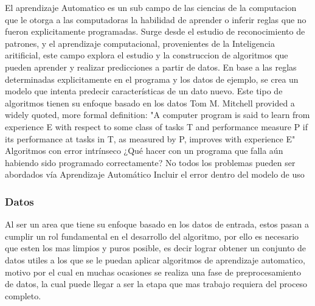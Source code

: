 \documentclass[a4paper,10pt]{article}
\begin{document}
    El aprendizaje Automatico es un sub campo de las ciencias de la computacion que le otorga a las computadoras la habilidad de aprender o inferir reglas que no fueron explicitamente programadas.
    Surge desde el estudio de reconocimiento de patrones, y el aprendizaje computacional, provenientes de la Inteligencia aritificial, este campo explora el estudio y la construccion de algoritmos
    que pueden aprender y realizar predicciones a partir de datos. En base a las reglas determinadas explicitamente en el programa y los datos de ejemplo, se crea un modelo que intenta predecir
    características de un dato nuevo. Este tipo de algoritmos tienen su enfoque basado en los datos
    Tom M. Mitchell provided a widely quoted, more formal definition: "A computer program is said to learn from experience E with respect to some class of tasks T and 
    performance measure P if its performance at tasks in T, as measured by P, improves with experience E"
    Algoritmos con error intrínseco
    ¿Qué hacer con un programa que falla aún habiendo sido programado correctamente?
    No todos los problemas pueden ser abordados vía Aprendizaje Automático
    Incluir el error dentro del modelo de uso

    \subsubsection{Datos}
      Al ser un area que tiene su enfoque basado en los datos de entrada, estos pasan a cumplir un rol fundamental en el desarrollo del algoritmo, por ello es necesario que 
      esten los mas limpios y puros posible, es decir lograr obtener un conjunto de datos utiles a los que se le puedan aplicar algoritmos de aprendizaje automatico, 
      motivo por el cual en muchas ocasiones se realiza una fase de preprocesamiento de datos, la cual puede llegar a ser la etapa que mas trabajo requiera del proceso completo. 
\end{document}
